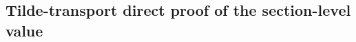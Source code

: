





\subsection{Tilde-transport direct proof of the section-level value}
\label{sec:fbc_tilde_transport_direct}


